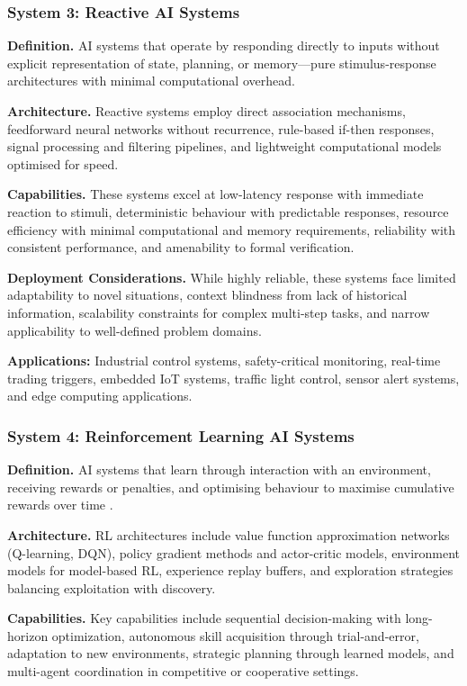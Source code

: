 \documentclass[acmsmall,screen,review]{acmart}
\begin{document}
\subsubsection{System 3: Reactive AI Systems}
\textbf{Definition.} AI systems that operate by responding directly to inputs without explicit representation of state, planning, or memory---pure stimulus-response architectures with minimal computational overhead.

\textbf{Architecture.} Reactive systems employ direct association mechanisms, feedforward neural networks without recurrence, rule-based if-then responses, signal processing and filtering pipelines, and lightweight computational models optimised for speed.

\textbf{Capabilities.} These systems excel at low-latency response with immediate reaction to stimuli, deterministic behaviour with predictable responses, resource efficiency with minimal computational and memory requirements, reliability with consistent performance, and amenability to formal verification.

\textbf{Deployment Considerations.} While highly reliable, these systems face limited adaptability to novel situations, context blindness from lack of historical information, scalability constraints for complex multi-step tasks, and narrow applicability to well-defined problem domains.

\textbf{Applications:} Industrial control systems, safety-critical monitoring, real-time trading triggers, embedded IoT systems, traffic light control, sensor alert systems, and edge computing applications.

\subsubsection{System 4: Reinforcement Learning AI Systems}
\textbf{Definition.} AI systems that learn through interaction with an environment, receiving rewards or penalties, and optimising behaviour to maximise cumulative rewards over time \cite{kaelbling1996reinforcement, sutton2018reinforcement}.

\textbf{Architecture.} RL architectures include value function approximation networks (Q-learning, DQN), policy gradient methods and actor-critic models, environment models for model-based RL, experience replay buffers, and exploration strategies balancing exploitation with discovery.

\textbf{Capabilities.} Key capabilities include sequential decision-making with long-horizon optimization, autonomous skill acquisition through trial-and-error, adaptation to new environments, strategic planning through learned models, and multi-agent coordination in competitive or cooperative settings.
\end{document}
